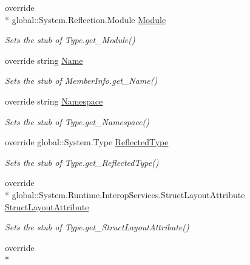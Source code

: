 \begin{DoxyCompactItemize}
override \\*
global\-::\-System.\-Reflection.\-Module \hyperlink{class_system_1_1_fakes_1_1_stub_type_a099162befbfea4da651c1a88c60a822c}{Module}
\begin{DoxyCompactList}\small\item\em Sets the stub of Type.\-get\-\_\-\-Module()\end{DoxyCompactList}\item 
override string \hyperlink{class_system_1_1_fakes_1_1_stub_type_acaef953cae5097dbd2aadae71d9df641}{Name}
\begin{DoxyCompactList}\small\item\em Sets the stub of Member\-Info.\-get\-\_\-\-Name()\end{DoxyCompactList}\item 
override string \hyperlink{class_system_1_1_fakes_1_1_stub_type_ab37630109cc96fc2fc9db251073904ad}{Namespace}
\begin{DoxyCompactList}\small\item\em Sets the stub of Type.\-get\-\_\-\-Namespace()\end{DoxyCompactList}\item 
override global\-::\-System.\-Type \hyperlink{class_system_1_1_fakes_1_1_stub_type_a571cc0cde0cc08d94834a37a53bcdb4c}{Reflected\-Type}
\begin{DoxyCompactList}\small\item\em Sets the stub of Type.\-get\-\_\-\-Reflected\-Type()\end{DoxyCompactList}\item 
override \\*
global\-::\-System.\-Runtime.\-Interop\-Services.\-Struct\-Layout\-Attribute \hyperlink{class_system_1_1_fakes_1_1_stub_type_a25db891dd7813dd566346191730407d4}{Struct\-Layout\-Attribute}
\begin{DoxyCompactList}\small\item\em Sets the stub of Type.\-get\-\_\-\-Struct\-Layout\-Attribute()\end{DoxyCompactList}\item 
override \\*

\end{DoxyCompactItemize}

